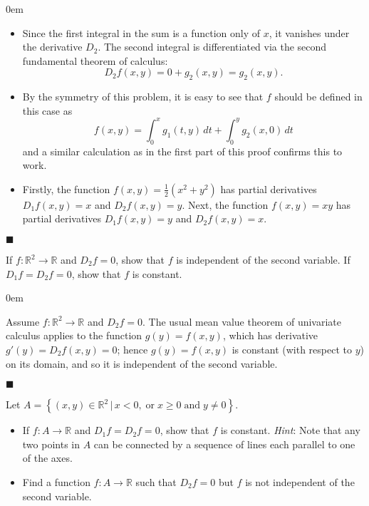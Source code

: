 \documentclass[12pt]{article}
\renewcommand{\qed}{\hfill$\blacksquare$}
\renewenvironment{proof}{\begin{addmargin}[1em]{0em}\begin{newproof}}{\end{newproof}\end{addmargin}\qed}
\newenvironment{problem}[2][Problem]{\begin{trivlist}
\item[\hskip \labelsep {\bfseries #1}\hskip \labelsep {\bfseries #2.}]}{\end{trivlist}}
\begin{document}
\begin{proof}
\begin{itemize}
	\item Since the first integral in the sum is a function only of $x$, it vanishes under the derivative $D_2$. The second integral is differentiated via the second fundamental theorem of calculus: $$ D_2 f\left(x,y\right) = 0 + g_2 \left(x,y\right) = g_2\left(x,y\right).$$
	\item By the symmetry of this problem, it is easy to see that $f$ should be defined in this case as $$ f\left(x,y\right) = \int_0^x g_1\left(t,y\right)\, dt + \int_0^y g_2\left(x,0\right)\, dt $$ and a similar calculation as in the first part of this proof confirms this to work.
	\item Firstly, the function $f\left(x,y\right) = \frac{1}{2}\left(x^2 + y^2\right)$ has partial derivatives $D_1 f\left(x,y\right) = x$ and $D_2 f\left(x,y\right) = y$. Next, the function $f\left(x,y\right) = xy$ has partial derivatives $D_1 f\left(x,y\right) = y$ and $D_2f\left(x,y\right) = x$.
\end{itemize}
\end{proof}





\begin{problem}{2-22}
If $f:\mathbb{R}^2\rightarrow \mathbb{R}$ and $D_2 f = 0$, show that $f$ is independent of the second variable. If $D_1 f= D_2 f=0$, show that $f$ is constant.
\end{problem}
\begin{proof}
Assume $f:\mathbb{R}^2 \rightarrow \mathbb{R}$ and $D_2 f=0$. The usual mean value theorem of univariate calculus applies to the function $g\left(y\right)=f\left(x,y\right)$, which has derivative $g'\left(y\right) = D_2 f\left(x,y\right) = 0$; hence $g\left(y\right) = f\left(x,y\right)$ is constant (with respect to $y$) on its domain, and so it is independent of the second variable.
\end{proof}






\begin{problem}{2-23}
Let $A=\left\{\left(x,y\right)\in \mathbb{R}^2 \, | \, x<0, \; \text{or} \; x\geq 0 \; \text{and} \; y\neq 0\right\}$.
\begin{itemize}
	\item If $f:A\rightarrow \mathbb{R}$ and $D_1 f = D_2 f = 0$, show that $f$ is constant. \textit{Hint}: Note that any two points in $A$ can be connected by a sequence of lines each parallel to one of the axes.
	\item Find a function $f:A\rightarrow \mathbb{R}$ such that $D_2 f=0$ but $f$ is not independent of the second variable.
\end{itemize}
\end{problem}
\end{document}
